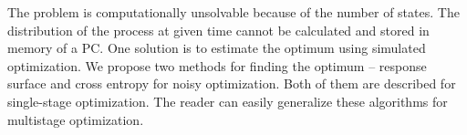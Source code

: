 The problem is computationally unsolvable because of the number of states. The distribution of the process at given time cannot be calculated and stored in memory of a PC. One solution is to estimate the optimum using simulated optimization. We propose two methods for finding the optimum -- response surface and cross entropy for noisy optimization. Both of them are described for single-stage optimization. The reader can easily generalize these algorithms for multistage optimization.
